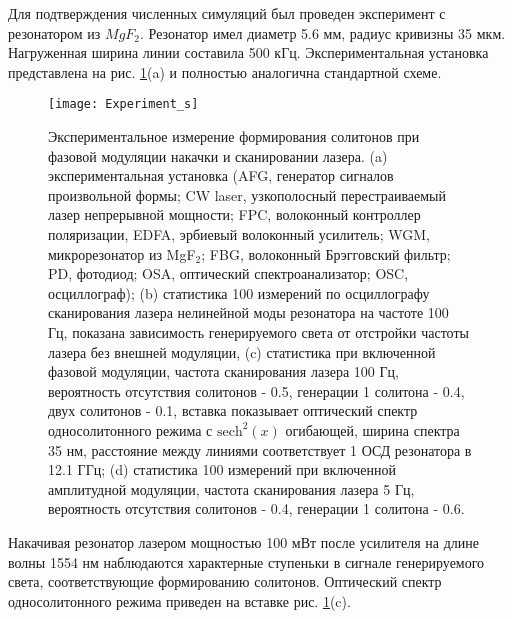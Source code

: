 
Для подтверждения численных симуляций был проведен эксперимент с резонатором из $MgF_2$. Резонатор имел диаметр 5.6 мм, радиус кривизны 35 мкм. Нагруженная ширина линии составила 500 кГц. Экспериментальная установка представлена на рис. \ref{chaos_order_experiment}(a) и полностью аналогична стандартной схеме.

\begin{figure}[ht]
\centering
  \texttt{[image: Experiment\_s]}
  \caption{Экспериментальное измерение формирования солитонов при фазовой модуляции накачки и сканировании лазера. (a) экспериментальная установка (AFG, генератор сигналов произвольной формы; CW laser, узкополосный перестраиваемый лазер непрерывной мощности; FPC, волоконный контроллер поляризации, EDFA, эрбиевый волоконный усилитель; WGM,  микрорезонатор из MgF$_2$; FBG, волоконный Брэгговский фильтр; PD, фотодиод; OSA, оптический спектроанализатор; OSC, осциллограф); (b) статистика 100 измерений по осциллографу сканирования лазера нелинейной моды резонатора на частоте 100 Гц, показана зависимость генерируемого света от отстройки частоты лазера без внешней модуляции, (c) статистика при включенной фазовой модуляции, частота сканирования лазера 100 Гц, вероятность отсутствия солитонов - 0.5, генерации 1 солитона - 0.4, двух солитонов - 0.1, вставка показывает оптический спектр односолитонного режима с $\text{sech}^2(x)$ огибающей, ширина спектра 35 нм, расстояние между линиями соответствует 1 ОСД резонатора в 12.1 ГГц; (d) статистика 100 измерений при включенной амплитудной модуляции, частота сканирования лазера 5 Гц, вероятность отсутствия солитонов - 0.4, генерации 1 солитона - 0.6.}
  \label{chaos_order_experiment}
\end{figure}

Накачивая резонатор лазером мощностью 100 мВт после усилителя на длине волны 1554 нм наблюдаются характерные ступеньки в сигнале генерируемого света, соответствующие формированию солитонов. Оптический спектр односолитонного режима приведен на вставке рис. \ref{chaos_order_experiment}(c).

